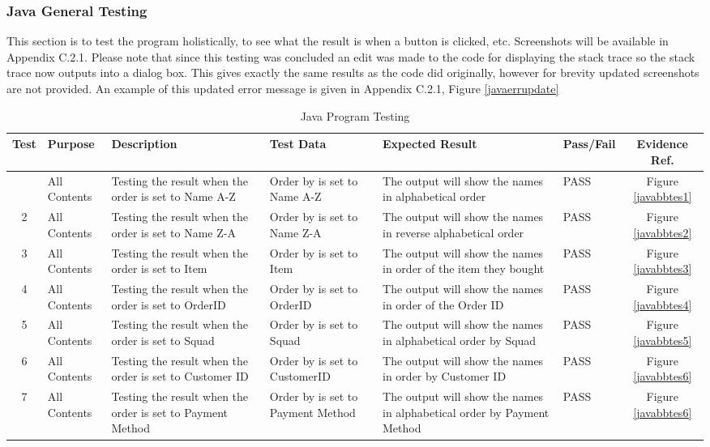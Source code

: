 \documentclass[
11pt, %
a4paper, %
oneside, %
headinclude,footinclude, %
BCOR5mm, %
]{scrartcl}
\begin{document}
	\subsubsection{Java General Testing}
		This section is to test the program holistically, to see what the result is when a button is clicked, etc. Screenshots will be available in Appendix C.2.1. Please note that since this testing was concluded an edit was made to the code for displaying the stack trace so the stack trace now outputs into a dialog box. This gives exactly the same results as the code did originally, however for brevity updated screenshots are not provided. An example of this updated error message is given in Appendix C.2.1, Figure \ref{javaerrupdate}
		\begin{longtable}[l]{|c|p{2.5cm}|p{3cm}|p{3cm}|p{3cm}|p{2cm}|c|}
				\caption{Java Program Testing}\\
			\hline
			Test & Purpose & Description & Test Data & Expected Result & Pass/Fail & Evidence Ref. \\ [0.5ex]
			\hline
			\endhead
			\hline
			\endfoot
			1 & All Contents & Testing the result when the order is set to Name A-Z & Order by is set to Name A-Z & The output will show the names in alphabetical order & PASS & Figure \ref{javabbtes1} \\
			2 & All Contents & Testing the result when the order is set to Name Z-A & Order by is set to Name Z-A & The output will show the names in reverse alphabetical order & PASS & Figure \ref{javabbtes2} \\
			3 & All Contents & Testing the result when the order is set to Item & Order by is set to Item & The output will show the names in order of the item they bought & PASS & Figure \ref{javabbtes3} \\
			4 & All Contents & Testing the result when the order is set to OrderID & Order by is set to OrderID & The output will show the names in order of the Order ID & PASS & Figure \ref{javabbtes4} \\
			5 & All Contents & Testing the result when the order is set to Squad & Order by is set to Squad & The output will show the names in alphabetical order by Squad & PASS & Figure \ref{javabbtes5} \\
			6 & All Contents & Testing the result when the order is set to Customer ID & Order by is set to CustomerID & The output will show the names in order by Customer ID & PASS & Figure \ref{javabbtes6} \\
			7 & All Contents & Testing the result when the order is set to Payment Method & Order by is set to Payment Method & The output will show the names in alphabetical order by Payment Method & PASS & Figure \ref{javabbtes6} \\

\end{longtable}
\end{document}
